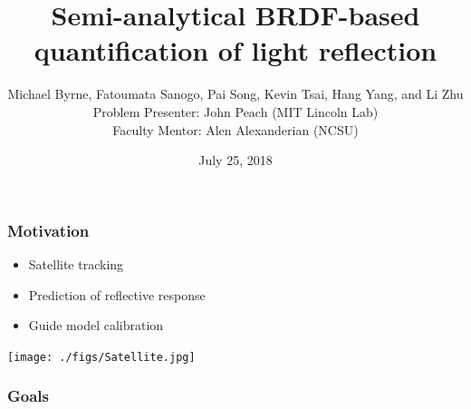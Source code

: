 \documentclass{beamer}
\title{Semi-analytical BRDF-based quantification of light reflection}
\date{July 25, 2018}
\author{
Michael Byrne, 
Fatoumata Sanogo,
Pai Song,
Kevin Tsai,
Hang Yang, and
Li Zhu\\
\medskip
Problem Presenter:  John Peach (MIT Lincoln Lab)\\
Faculty Mentor: Alen Alexanderian (NCSU)
}
\institute[Abbreviation]{SAMSI-IMSM}
\begin{document}
\begin{frame}
\titlepage
\end{frame}

\begin{frame}[t] 
\frametitle{Motivation} 
\begin{itemize} 
\item Satellite tracking 
\item Prediction of reflective response 
\item Guide model calibration 
\vspace{2mm}
\end{itemize} 
\centerline{\texttt{[image: ./figs/Satellite.jpg]}} 
\end{frame} 
 
\begin{frame}[t]
\frametitle{Goals} 


\end{frame}
\end{document}
